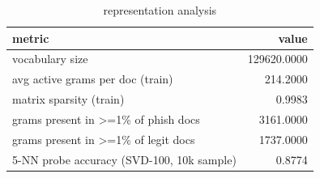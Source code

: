 \begin{table}[htbp]
\caption{representation analysis}
\label{tab:representation_analysis}
\begin{tabular}{lr}
\toprule
metric & value \\
\midrule
vocabulary size & 129620.0000 \\
avg active grams per doc (train) & 214.2000 \\
matrix sparsity (train) & 0.9983 \\
grams present in >=1\% of phish docs & 3161.0000 \\
grams present in >=1\% of legit docs & 1737.0000 \\
5-NN probe accuracy (SVD-100, 10k sample) & 0.8774 \\
\bottomrule
\end{tabular}
\end{table}
